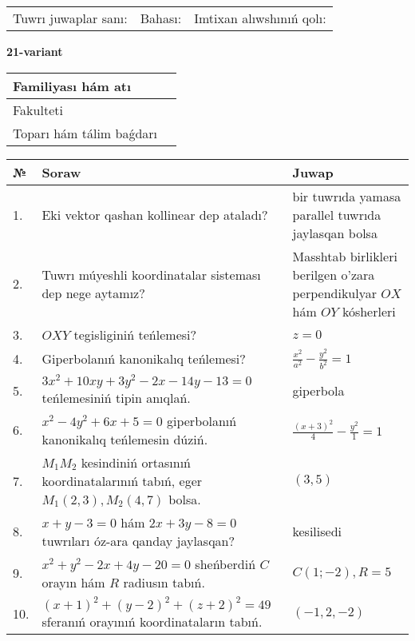 \documentclass{article}
\begin{document}
\vspace{1cm}

\begin{tabular}{lll}
Tuwrı juwaplar sanı: \underline{\hspace{1.5cm}} & 
Bahası: \underline{\hspace{1.5cm}} & 
Imtixan alıwshınıń qolı: \underline{\hspace{2cm}} \\
\end{tabular}

\egroup

\newpage


\textbf{21-variant}\\

\bgroup
\def\arraystretch{1.6} %

\begin{tabular}{|m{5.7cm}|m{9.5cm}|}
\hline
Familiyası hám atı & \\
\hline
Fakulteti  & \\
\hline
Toparı hám tálim baǵdarı  & \\
\hline
\end{tabular}

\vspace{1cm}

\begin{tabular}{|m{0.7cm}|m{10cm}|m{4cm}|}
\hline
№ & Soraw & Juwap \\
\hline
1. & Eki vektor qashan kollinear dep ataladı? & bir tuwrıda yamasa parallel tuwrıda jaylasqan bolsa \\
\hline
2. & Tuwrı múyeshli koordinatalar sisteması dep nege aytamız? & Masshtab birlikleri berilgen o'zara perpendikulyar $OX$ hám $OY$ kósherleri \\
\hline
3. & $OXY$ tegisliginiń teńlemesi? & $z=0$ \\
\hline
4. & Giperbolanıń kanonikalıq teńlemesi? & $\frac{x^2}{a^2}-\frac{y^2}{b^2}=1$ \\
\hline
5. & $3x^{2}+10xy+3y^{2}-2x-14y-13=0$ teńlemesiniń tipin anıqlań. & giperbola \\
\hline
6. & $x^{2}-4y^{2}+6x+5=0$ giperbolanıń kanonikalıq teńlemesin dúziń. & $\frac{(x+3)^{2}}{4}-\frac{y^{2}}{1}=1$ \\
\hline
7. & $M_{1}M_{2}$ kesindiniń ortasınıń koordinatalarınıń tabıń, eger $M_{1} (2, 3), M_{2} (4, 7)$ bolsa. & $(3,5)$ \\
\hline
8. & $x+y-3=0$ hám $2x+3y-8=0$ tuwrıları óz-ara qanday jaylasqan? & kesilisedi \\
\hline
9. & $x^{2}+y^{2}-2x+4y-20=0$ sheńberdiń $C$ orayın hám $R$ radiusın tabıń. & $C(1;-2), R=5$ \\
\hline
10. & $(x+1)^{2}+(y-2) ^{2}+(z+2) ^{2}=49$ sferanıń orayınıń koordinataların tabıń. & $(-1,2,-2)$ \\
\hline
\end{tabular}
\end{document}
